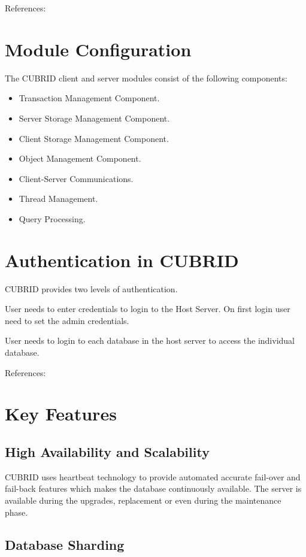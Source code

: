 \documentclass[9pt,twocolumn,twoside]{../../styles/osajnl}
\begin{document}
References: \cite{www-cubrid.org}


\section{Module Configuration}

The CUBRID client and server modules consist of the following components:

\begin{itemize}
\item Transaction Management Component.
\item Server Storage Management Component.
\item Client Storage Management Component.
\item Object Management Component.
\item Client-Server Communications.
\item Thread Management.
\item Query Processing.
\end{itemize}

\section{Authentication in CUBRID}


CUBRID provides two levels of authentication.

User needs to enter credentials to login to the Host Server. On first
login user need to set the admin credentials.

User needs to login to each database in the host server to access the
individual database.

References: \cite{www-authentication}


\section{Key Features}

\subsection{High Availability and Scalability}

CUBRID uses heartbeat technology to
provide automated accurate fail-over and fail-back features which
makes the database continuously available. The server is available
during the upgrades, replacement or even during the maintenance phase.

\subsection{Database Sharding}
\end{document}
